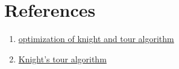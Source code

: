 \documentclass[conference]{IEEEtran}
\begin{document}
\section{\textbf {References}} 
\begin{enumerate}

\item  \href{https://stackoverflow.com/questions/19214109/how-to-optimize-knights-tour-algorithm}{optimization of knight and tour algorithm}\\
    
\item  \href{https://www.geeksforgeeks.org/warnsdorffs-algorithm-knights-tour-problem/}{
Knight's tour algorithm}
\\

\end{enumerate}
\end{document}
